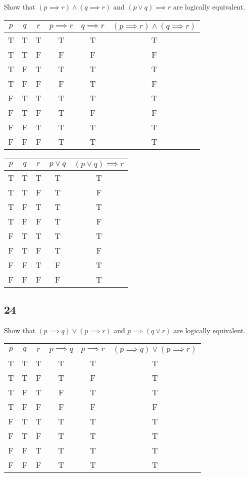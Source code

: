 \documentclass{article}
\begin{document}
Show that $ ( p \implies r ) \land ( q \implies r ) $ and $ ( p \lor q ) \implies r $ are logically equivalent.

\begin{tabular}{ | c | c | c | c | c | c | }
	$ p $ & $ q $ & $ r $ & $ p \implies r $ & $ q \implies r $ & $ ( p \implies r ) \land ( q \implies r ) $ \\
	\hline
	T & T & T & T & T & T \\
	T & T & F & F & F & F \\
	T & F & T & T & T & T \\
	T & F & F & F & T & F \\
	F & T & T & T & T & T \\
	F & T & F & T & F & F \\
	F & F & T & T & T & T \\
	F & F & F & T & T & T \\
\end{tabular}

\begin{tabular}{ | c | c | c | c | c | }
	$ p $ & $ q $ & $ r $ & $ p \lor q $ & $ ( p \lor q ) \implies r $ \\
	\hline
	T & T & T & T & T \\
	T & T & F & T & F \\
	T & F & T & T & T \\
	T & F & F & T & F \\
	F & T & T & T & T \\
	F & T & F & T & F \\
	F & F & T & F & T \\
	F & F & F & F & T \\
\end{tabular}

\subsection{24}

Show that $ ( p \implies q ) \lor ( p \implies r ) $ and $ p \implies ( q \lor r ) $ are logically equivalent.

\begin{tabular}{ | c | c | c | c | c | c | }
	$ p $ & $ q $ & $ r $ & $ p \implies q $ & $ p \implies r $ & $ ( p \implies q ) \lor ( p \implies r ) $ \\
	\hline
	T & T & T & T & T & T \\
	T & T & F & T & F & T \\
	T & F & T & F & T & T \\
	T & F & F & F & F & F \\
	F & T & T & T & T & T \\
	F & T & F & T & T & T \\
	F & F & T & T & T & T \\
	F & F & F & T & T & T \\
\end{tabular}
\end{document}
